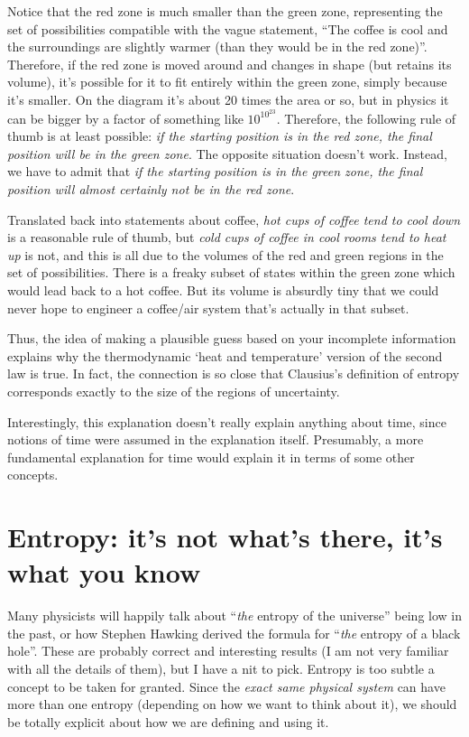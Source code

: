 \documentclass[a4paper, 12pt]{article}
\begin{document}
Notice that the red zone is much smaller than the green zone,
representing the set of possibilities compatible with the vague statement,
``The coffee is cool and the surroundings are slightly warmer (than they
would be in the red zone)''. Therefore, if the red zone is moved around and
changes in shape (but retains its volume), it's possible for it to fit entirely
within the green zone, simply because it's smaller.
On the diagram it's about 20 times the area or so,
but in physics it can be bigger by a factor of something like $10^{10^{23}}$.
Therefore, the following rule of thumb is at least
possible: {\em if the starting position is in the red zone, the final position
will be in the green zone}. The opposite situation doesn't work. Instead, we
have to admit that
{\em if the starting position is in the green zone, the final position will
almost certainly not be in the red zone}.

Translated back into statements about
coffee, {\em hot cups of coffee tend to cool down} is a reasonable rule of
thumb, but {\em cold cups of coffee in cool rooms tend to heat up} is not, and
this is all due to the volumes of the red and green regions in the set of
possibilities. There is a freaky subset of states within the green zone which
would lead back to a hot coffee. But its volume is absurdly tiny that we could
never hope to engineer a coffee/air system that's actually in that subset.

Thus, the idea of making a plausible guess based on your incomplete information
explains why the thermodynamic `heat and temperature' version of the
second law is true. In fact, the connection is so close that
Clausius's definition of entropy corresponds exactly to the size of the
regions of uncertainty.

Interestingly, this explanation doesn't really explain anything about time,
since notions of time were assumed in the explanation itself. Presumably,
a more fundamental explanation for time would explain it in terms of some
other concepts.

\section*{Entropy: it's not what's there, it's what you know}
Many physicists will
happily talk about ``{\em the} entropy of the universe'' being low in the past,
or how Stephen Hawking derived the formula for
``{\em the} entropy of a black hole''. These are
probably correct and interesting results (I am not very familiar with all the
details of them), but I have a nit to pick.
Entropy is too subtle a concept to be taken for granted.
Since the {\em exact same physical system}
can have more than one entropy (depending on how we want to think about it),
we should be totally explicit about how we are defining and using it.
\end{document}
